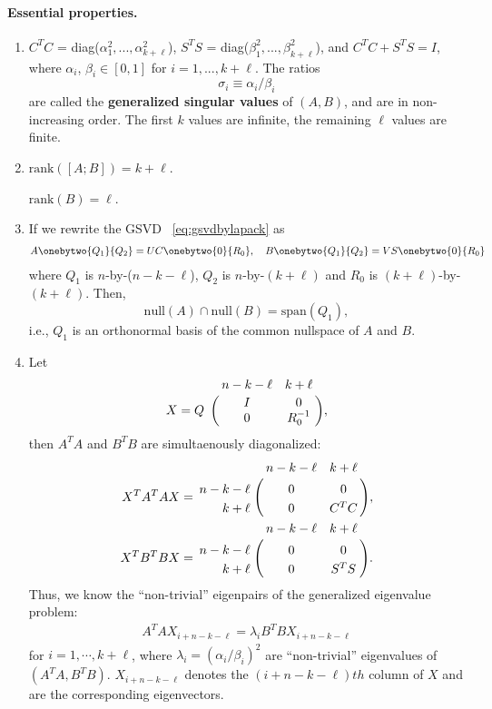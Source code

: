 \paragraph{Essential properties.} \label{properties}
\begin{enumerate}
\item $C^T C $ = diag($\alpha_1^{2}, ..., \alpha_{k+\ell}^{2}$), 
      $S^T S$ = diag($\beta_1^{2}, ..., \beta_{k+\ell}^{2}$), 
      and $C^T C + S^T S = I$,
where $\alpha_i$, $\beta_i \in [0, 1]$ for $i = 1,..., k+\ell$. 
The ratios 
\begin{equation} \label{eq:gsvdef}  
\sigma_i \equiv \alpha_i/\beta_i
\end{equation} 
are called the 
\textbf{generalized singular values} of $(A, B)$, 
and are in non-increasing order. 
The first $k$ values are infinite, 
the remaining $\ell$ values are finite.
         
\item $\mbox{rank}([A; B]) = k+\ell$.
             
      $\mbox{rank}(B) = \ell$.
         
\item If we rewrite the GSVD ~\eqref{eq:gsvdbylapack} as 
\begin{align}
A\onebytwo{Q_1}{Q_2} = UC\onebytwo{0}{R_0}, \quad 
B\onebytwo{Q_1}{Q_2} = VS\onebytwo{0}{R_0}
\end{align}
where $Q_1$ is $n$-by-($n-k-\ell$), $Q_2$ is $n$-by-$(k+\ell)$ 
and $R_0$ is $(k+\ell)$-by-$(k+\ell)$. Then, 
\[
\mbox{null}(A)\cap \mbox{null}(B) = \mbox{span}(Q_1),
\] 
i.e., $Q_1$ is an orthonormal basis 
of the common nullspace of $A$ and $B$.
         
\item Let 
$$
X = Q\bordermatrix{ & n-k-\ell & k+\ell   \cr
                                    \hfill & I & 0 \cr
                                    \hfill & 0 & R_0^{-1} },
$$ 
then $A^TA$ and $B^TB$ are simultaenously diagonalized: 
\begin{subequations} \label{eq:simuldiag} 
\begin{align} 
X^TA^TAX & = \bordermatrix{ & n-k-\ell & k+\ell   \cr
                \hfill n-k-\ell & 0 & 0 \cr
                \hfill k+\ell & 0 & C^TC}, \label{eq:simuldiag1} \\ 
X^TB^TBX & = \bordermatrix{ & n-k-\ell & k+\ell   \cr
                \hfill n-k-\ell & 0 & 0 \cr
                \hfill k+\ell & 0 & S^TS}. \label{eq:simuldiag2} 
\end{align} 
\end{subequations} 
Thus, we know the ``non-trivial'' eigenpairs of the generalized eigenvalue 
problem:
\begin{align*}
A^TAX_{i+n-k-\ell} = \lambda_{i} B^TBX_{i+n-k-\ell}
\end{align*}
for $i = 1, \cdots, k+\ell$, 
where $\lambda_i = (\alpha_i/\beta_i)^2$ 
are ``non-trivial'' eigenvalues of $(A^TA, B^TB)$. 
$X_{i+n-k-\ell}$ denotes the $(i+n-k-\ell)th$ column of $X$ 
and are the corresponding eigenvectors.
            

\end{enumerate}

